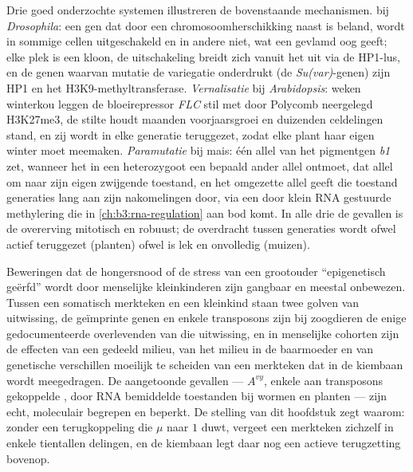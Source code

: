 \begin{proposition}\label{prop:b3:chromatin-epigenetics:examples}
Drie goed onderzochte systemen illustreren de bovenstaande
mechanismen. \emph{} bij \emph{Drosophila}:
een gen dat door een chromosoomherschikking naast  is
beland, wordt in sommige cellen uitgeschakeld en in andere niet, wat
een gevlamd oog geeft; elke plek is een kloon, de uitschakeling breidt
zich vanuit het  uit via de HP1-lus, en de genen
waarvan mutatie de variegatie onderdrukt (de \emph{Su(var)}-genen)
zijn HP1 en het H3K9-methyltransferase. \emph{Vernalisatie} bij
\emph{Arabidopsis}: weken winterkou leggen de bloeirepressor
\emph{FLC} stil met door Polycomb neergelegd H3K27me3, de stilte houdt
maanden voorjaarsgroei en duizenden celdelingen stand, en zij wordt in
elke generatie teruggezet, zodat elke plant haar eigen winter moet
meemaken. \emph{Paramutatie} bij mais: één allel van het pigmentgen
\emph{b1} zet, wanneer het in een heterozygoot een bepaald ander allel
ontmoet, dat allel om naar zijn eigen zwijgende toestand, en het
omgezette allel geeft die toestand generaties lang aan zijn
nakomelingen door, via een door klein RNA gestuurde methylering die in
\cref{ch:b3:rna-regulation} aan bod komt. In alle drie de gevallen is
de overerving mitotisch en robuust; de overdracht tussen generaties
wordt ofwel actief teruggezet (planten) ofwel is lek en onvolledig
(muizen).
\end{proposition}

\begin{remark}\label{rem:b3:chromatin-epigenetics:limits}
Beweringen dat de hongersnood of de stress van een grootouder
``epigenetisch geërfd'' wordt door menselijke kleinkinderen zijn
gangbaar en meestal onbewezen. Tussen een somatisch merkteken en een
kleinkind staan twee golven van uitwissing, de geïmprinte genen en
enkele transposons zijn bij zoogdieren de enige gedocumenteerde
overlevenden van die uitwissing, en in menselijke cohorten zijn de
effecten van een gedeeld milieu, van het milieu in de baarmoeder en
van genetische verschillen moeilijk te scheiden van een merkteken dat
in de kiembaan wordt meegedragen. De aangetoonde gevallen ---
$A^{vy}$, enkele aan transposons gekoppelde , door RNA
bemiddelde toestanden bij wormen en planten --- zijn echt, moleculair
begrepen en beperkt. De stelling van dit hoofdstuk zegt waarom: zonder
een terugkoppeling die $\mu$ naar $1$ duwt, vergeet een merkteken
zichzelf in enkele tientallen delingen, en de kiembaan legt daar nog
een actieve terugzetting bovenop.
\end{remark}

